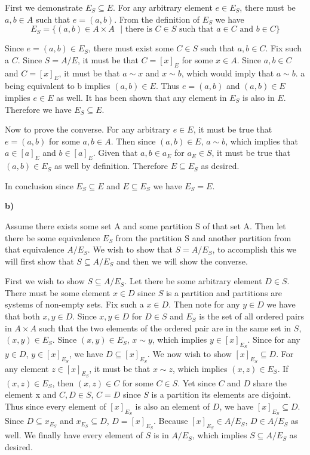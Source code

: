 \documentclass{article}
\begin{document}
\medskip

First we demonstrate $E_S \subseteq E$. For any arbitrary element $e \in E_S$, there must be $a,b \in A$ such that $e = (a,b)$. From the definition of $E_S$ we have $$E_S = \{(a,b) \in A \times A \text{ } | \text{  there is } C \in S \text { such that } a \in C \text { and } b \in C\}$$

Since $e = (a,b) \in E_S$, there must exist some $C \in S$ such that $a,b \in C$. Fix such a $C$. Since $S = A/E$, it must be that $C = [x]_E$ for some $x \in A$. Since $a,b \in C$ and $C = [x]_E$, it must be that $a \sim x$ and $x \sim b$, which would imply that $a \sim b$. a being equivalent to b implies $(a,b) \in E$. Thus $e = (a,b)$ and $(a,b) \in E$ implies $e \in E$ as well. It has been shown that any element in $E_S$ is also in $E$. Therefore we have $E_S \subseteq E$.

\medskip

Now to prove the converse. For any arbitrary $e \in E$, it must be true that $e = (a,b)$ for some $a,b \in A$. Then since $(a,b) \in E$, $a \sim b$, which implies that $a \in [a]_{E}$ and $b \in [a]_{E}$. Given that $a,b \in a_{E}$ for $a_{E} \in S$, it must be true that $(a,b) \in E_S$ as well by definition. Therefore $E \subseteq E_S$ as desired.

\medskip

In conclusion since $E_S \subseteq E$ and $E \subseteq E_S$ we have $E_S = E$.

\medskip
\textbf{b)}
\medskip

Assume there exists some set A and some partition S of that set A. Then let there be some equivalence $E_S$ from the partition S and another partition from that equivalence $A/E_S$. We wish to show that $S = A/E_S$, to accomplish this we will first show that $S \subseteq A/E_S$ and then we will show the converse.

\medskip
First we wish to show $S \subseteq A/E_S$. Let there be some arbitrary element $D \in S$. There must be some element $x \in D$ since $S$ is a partition and partitions are systems of non-empty sets. Fix such a $x \in D$. Then note for any $y \in D$ we have that both $x,y \in D$. Since $x,y \in D$ for $D \in S$ and $E_S$ is the set of all ordered pairs in $A \times A$ such that the two elements of the ordered pair are in the same set in $S$, $(x,y) \in E_S$. Since $(x,y) \in E_S$, $x \sim y$, which implies $y \in [x]_{E_S}$. Since for any $y \in D$, $y \in [x]_{E_S}$, we have $D \subseteq [x]_{E_S}$. We now wish to show $[x]_{E_S} \subseteq D$. For any element $z \in [x]_{E_S}$, it must be that $x \sim z$, which implies $(x,z) \in E_S$. If $(x,z) \in E_S$, then $(x,z) \in C$ for some $C \in S$. Yet since $C$ and $D$ share the element x and $C,D \in S$, $C = D$ since $S$ is a partition its elements are disjoint. Thus since every element of $[x]_{E_S}$ is also an element of $D$, we have $[x]_{E_S} \subseteq D$. Since $D \subseteq x_{E_S}$ and $x_{E_S} \subseteq D$, $D = [x]_{E_S}$. Because $[x]_{E_S} \in A/E_S$, $D \in A/E_S$ as well. We finally have every element of $S$ is in $A/E_S$, which implies $S \subseteq A/E_S$ as desired.
\end{document}
